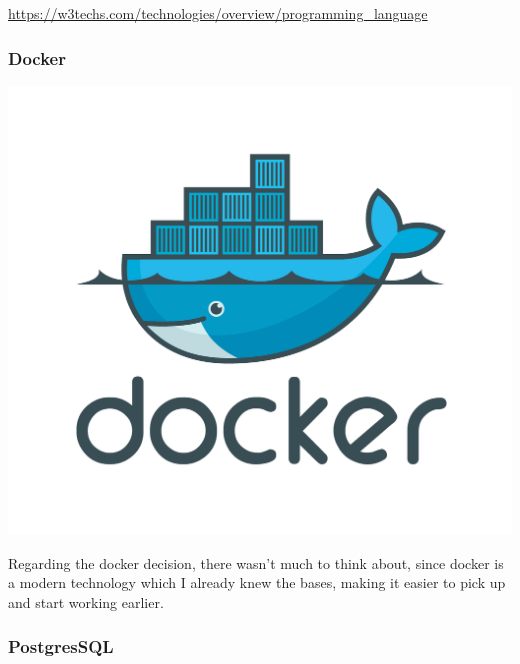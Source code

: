 \documentclass[11pt]{article}
\begin{document}
        \url{https://w3techs.com/technologies/overview/programming_language}

        \subsubsection[Docker]{Docker}

        \begin{center}
            \includegraphics[scale=0.3]{logo_docker}
        \end{center}

        \begin{flushleft}
            Regarding the docker decision, there wasn't much to think about, since docker is a modern technology which I
            already knew the bases, making it easier to pick up and start working earlier.
        \end{flushleft}
        \newpage
        \subsubsection[PostgreSQL]{PostgresSQL}
\end{document}
